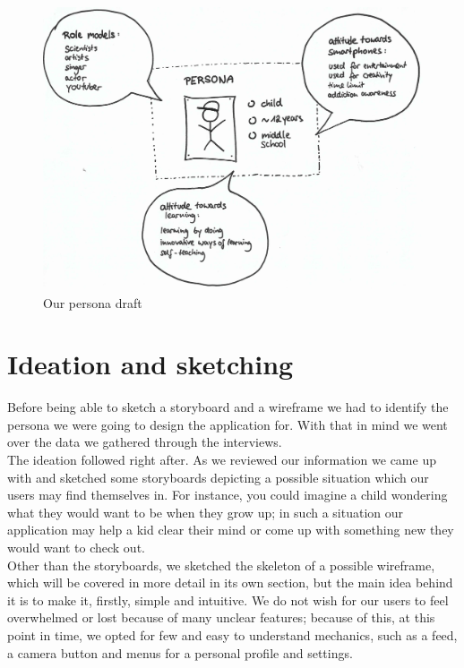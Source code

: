 \documentclass[12pt]{scrartcl}
\begin{document}
	\begin{figure}[H]
        		\centering
       		\includegraphics[width=\textwidth]{../images/persona2.jpg}
       		\caption{Our persona draft}
        		\label{persona1}
	\end{figure}
	

\section{Ideation and sketching}

	Before being able to sketch a storyboard and a wireframe we had to identify the persona we 
	were going to design the application for. With that in mind we went over the data we gathered
	through the interviews.\\
	
	The ideation followed right after. As we reviewed our information we came up with and sketched 
	some storyboards depicting a possible situation which our users may find themselves in. 
	For instance, you could imagine a child wondering what they would want to be when they grow
	up; in such a situation our application may help a kid clear their mind or come up with something
	new they would want to check out.\\
	
	Other than the storyboards, we sketched the skeleton of a possible wireframe, which will be
	covered in more detail in its own section, but the main idea behind it is to make it, firstly,
	simple and intuitive. We do not wish for our users to feel overwhelmed or lost because of
	many unclear features; because of this, at this point in time, we opted for few and easy to
	understand mechanics, such as a feed, a camera button and menus for a personal profile and
	settings.\\
	
\end{document}
